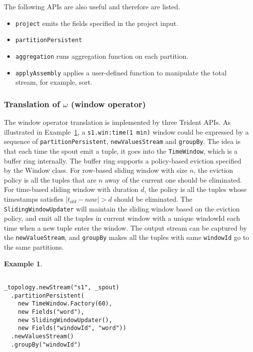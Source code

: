 \documentclass[conference, twocolumn, 11pt]{IEEEtran}
\theoremstyle{definition}
\newtheorem{example}{Example}[section]
\begin{document}
The following APIs are also useful and therefore are listed.
\begin{itemize}
\item \texttt{project} emits the fields specified in the project input.
\item \texttt{partitionPersistent}
\item \texttt{aggregation} runs aggregation function on each partition.
\item \texttt{applyAssembly} applies a user-defined function to manipulate the total stream, for example, sort.
\end{itemize}

\subsubsection{Translation of $\omega$ (window operator)}
The window operator translation is implemented by three Trident APIs. As illustrated in Example~\ref{win-trans}, a \texttt{s1.win:time(1 min)} window could be expressed by a sequence of \texttt{partitionPersistent}, \texttt{newValuesStream} and \texttt{groupBy}. The idea is that each time the spout emit a tuple, it goes into the \texttt{TimeWindow}, which is a buffer ring internally. The buffer ring supports a policy-based eviction specified by the Window class. For row-based sliding window with size $n$, the eviction policy is all the tuples that are $n$ away of the current one should be eliminated. For time-based sliding window with duration $d$, the policy is all the tuples whose timestamps satisfies $|t_{old} - now| > d$ should be eliminated. The \texttt{SlidingWindowUpdater} will maintain the sliding window based on the eviction policy, and emit all the tuples in current window with a unique windowId each time when a new tuple enter the window. The output stream can be captured by the \texttt{newValueStream}, and \texttt{groupBy} makes all the tuples with same \texttt{windowId} go to the same partitions. 
\begin{example}\label{win-trans}
\begin{verbatim}

_topology.newStream("s1", _spout) 
  .partitionPersistent(
    new TimeWindow.Factory(60),
    new Fields("word"), 
    new SlidingWindowUpdater(), 
    new Fields("windowId", "word"))
  .newValuesStream()
  .groupBy("windowId")
\end{verbatim}
\end{example}
\end{document}
